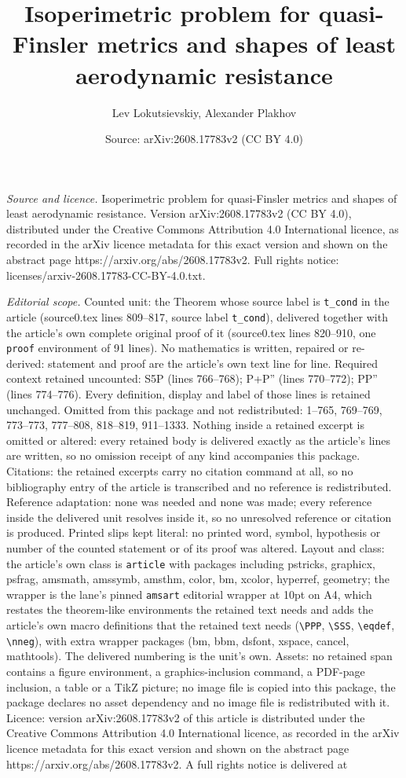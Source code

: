 \documentclass[10pt,a4paper]{amsart}
\title[Isoperimetric problem for quasi-Finsler metrics and shapes o]{Isoperimetric problem for quasi-Finsler metrics and shapes of least aerodynamic resistance}
\author{Lev Lokutsievskiy, Alexander Plakhov}
\date{Source: arXiv:2608.17783v2 (CC BY 4.0)}
\begin{document}
\maketitle

\noindent\emph{Source and licence.} Isoperimetric problem for quasi-Finsler metrics and shapes of least aerodynamic resistance. Version arXiv:2608.17783v2 (CC BY 4.0), distributed under the Creative Commons Attribution 4.0 International licence, as recorded in the arXiv licence metadata for this exact version and shown on the abstract page https://arxiv.org/abs/2608.17783v2. Full rights notice: licenses/arxiv-2608.17783-CC-BY-4.0.txt.\par\smallskip

\noindent\textit{Editorial scope.} Counted unit: the Theorem whose source label is \texttt{t\_cond} in the article (source0.tex lines 809--817, source label \texttt{t\_cond}), delivered together with the article's own complete original proof of it (source0.tex lines 820--910, one \texttt{proof} environment of 91 lines). No mathematics is written, repaired or re-derived: statement and proof are the article's own text line for line. Required context retained uncounted: S5P (lines 766--768); P+P'' (lines 770--772); PP'' (lines 774--776). Every definition, display and label of those lines is retained unchanged. Omitted from this package and not redistributed: 1--765, 769--769, 773--773, 777--808, 818--819, 911--1333. Nothing inside a retained excerpt is omitted or altered: every retained body is delivered exactly as the article's lines are written, so no omission receipt of any kind accompanies this package. Citations: the retained excerpts carry no citation command at all, so no bibliography entry of the article is transcribed and no reference is redistributed. Reference adaptation: none was needed and none was made; every reference inside the delivered unit resolves inside it, so no unresolved reference or citation is produced. Printed slips kept literal: no printed word, symbol, hypothesis or number of the counted statement or of its proof was altered. Layout and class: the article's own class is \texttt{article} with packages including pstricks, graphicx, psfrag, amsmath, amssymb, amsthm, color, bm, xcolor, hyperref, geometry; the wrapper is the lane's pinned \texttt{amsart} editorial wrapper at 10pt on A4, which restates the theorem-like environments the retained text needs and adds the article's own macro definitions that the retained text needs (\texttt{\textbackslash PPP}, \texttt{\textbackslash SSS}, \texttt{\textbackslash eqdef}, \texttt{\textbackslash nneg}), with extra wrapper packages (bm, bbm, dsfont, xspace, cancel, mathtools). The delivered numbering is the unit's own. Assets: no retained span contains a figure environment, a graphics-inclusion command, a PDF-page inclusion, a table or a TikZ picture; no image file is copied into this package, the package declares no asset dependency and no image file is redistributed with it. Licence: version arXiv:2608.17783v2 of this article is distributed under the Creative Commons Attribution 4.0 International licence, as recorded in the arXiv licence metadata for this exact version and shown on the abstract page https://arxiv.org/abs/2608.17783v2. A full rights notice is delivered at 
\end{document}
